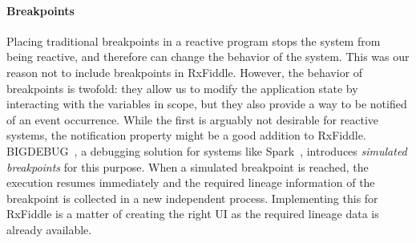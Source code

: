 \paragraph{Breakpoints}
\label{breakpoints}
Placing traditional breakpoints in a reactive program stops the system from being reactive, and therefore can change the behavior of the system. This was our reason not to include breakpoints in RxFiddle. However, the behavior of breakpoints is twofold: they allow us to modify the application state by interacting with the variables in scope, but they also provide a way to be notified of an event occurrence. While the first is arguably not desirable for reactive systems, the notification property might be a good addition to RxFiddle. BIGDEBUG~\cite{Gulzar2016}, a debugging solution for systems like Spark~\cite{zaharia2012resilient}, introduces \textit{simulated breakpoints} for this purpose. When a simulated breakpoint is reached, the execution resumes immediately and the required lineage information of the breakpoint is collected in a new independent process. Implementing this for RxFiddle is a matter of creating the right UI as the required lineage data is already available.
